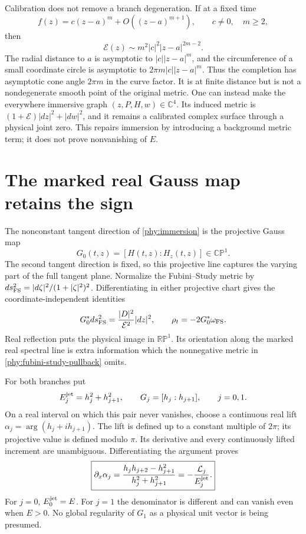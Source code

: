 \documentclass[11pt]{article}
\numberwithin{equation}{section}
\theoremstyle{definition}
\theoremstyle{remark}
\begin{document}
Calibration does not remove a branch degeneration.  If at a fixed time
\[
 f(z)=c(z-a)^m+O((z-a)^{m+1}),\qquad c\ne0,\quad m\ge2,
\]
then
\begin{equation}
 \mathcal E(z)\sim m^2|c|^2|z-a|^{2m-2}.
 \label{phy:cone-metric}
\end{equation}
The radial distance to $a$ is asymptotic to $|c||z-a|^m$, and the
circumference of a small coordinate circle is asymptotic to
$2\pi m|c||z-a|^m$.  Thus the completion has asymptotic cone angle
$2\pi m$ in the curve factor.  It is at finite distance but is not a
nondegenerate smooth point of the original metric.
One can instead make the everywhere immersive graph
$(z,P,H,w)\in\mathbb C^4$.  Its induced metric is
$(1+\mathcal E)|dz|^2+|dw|^2$, and it remains a calibrated complex surface
through a physical joint zero.  This repairs immersion by introducing a
background metric term; it does not prove nonvanishing of $E$.

\section{The marked real Gauss map retains the sign}
\label{phy:real-gauss-map}

The nonconstant tangent direction of \eqref{phy:immersion} is the
projective Gauss map
\begin{equation}
 G_0(t,z)=[H(t,z):H_z(t,z)]\in\mathbb{CP}^1.
 \label{phy:gauss-map-zero}
\end{equation}
The second tangent direction is fixed, so this projective line captures
the varying part of the full tangent plane.  Normalize the Fubini--Study
metric by
$ds_{\rm FS}^2=|d\zeta|^2/(1+|\zeta|^2)^2$.  Differentiating in either
projective chart gives the coordinate-independent identities
\begin{equation}
 G_0^*ds_{\rm FS}^2=\frac{|D|^2}{\mathcal E^2}|dz|^2,
 \qquad \rho_t=-2G_0^*\omega_{\rm FS}.
 \label{phy:fubini-study-pullback}
\end{equation}
Real reflection puts the physical image in $\mathbb{RP}^1$.  Its
orientation along the marked real spectral line is extra information
which the nonnegative metric in \eqref{phy:fubini-study-pullback} omits.

For both branches put
\begin{equation}
 E_j^{\rm jet}=h_j^2+h_{j+1}^2,\qquad
 G_j=[h_j:h_{j+1}],\qquad j=0,1.
 \label{phy:branch-gauss-map}
\end{equation}
On a real interval on which this pair never vanishes, choose a continuous
real lift $\alpha_j=\arg(h_j+i h_{j+1})$.  The lift is defined up to a
constant multiple of $2\pi$; its projective value is defined modulo $\pi$.
Its derivative and every continuously lifted increment are unambiguous.
Differentiating the argument proves
\begin{equation}
 \boxed{\partial_x\alpha_j
  =\frac{h_jh_{j+2}-h_{j+1}^2}{h_j^2+h_{j+1}^2}
  =-\frac{\mathcal L_j}{E_j^{\rm jet}}.}
 \label{phy:angle-derivative}
\end{equation}
For $j=0$, $E_0^{\rm jet}=E$.  For $j=1$ the denominator is different
and can vanish even when $E>0$.  No global regularity of $G_1$ as a
physical unit vector is being presumed.
\end{document}
